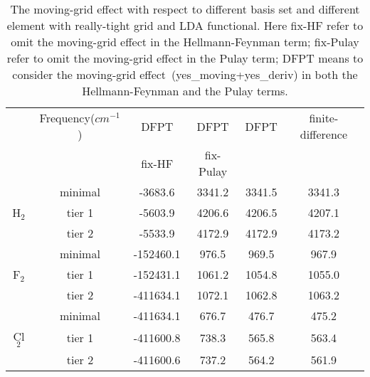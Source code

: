 \documentclass[journal=jpca,manuscript=article]{achemso}
\begin{document}
\begin{table}
\scalebox{0.8}
{
\begin{tabular}{ c c | c    c    c c    }
\hline \hline  
   &   Frequency($cm^{-1}$)    &  DFPT  &  DFPT & DFPT   & finite-difference    \\ 
   &                              &  fix-HF  &  fix-Pulay &  &    \\ 
\hline \hline  
   &    minimal       & -3683.6 &  3341.2  &   3341.5       &  3341.3 \\ 
H$_2$ & tier 1         & -5603.9 &  4206.6    &   4206.5      &  4207.1  \\    
   & tier 2         & -5533.9 & 4172.9    & 4172.9      &  4173.2 \\ 
\hline
   &  minimal         & -152460.1   &  976.5    &   969.5       & 967.9    \\ 
F$_2$ & tier 1         & -152431.1    & 1061.2     &  1054.8      & 1055.0    \\    
   & tier 2         & -411634.1   & 1072.1    &    1062.8      &  1063.2    \\ 
\hline
   &  minimal        & -411634.1   &  676.7   &  476.7      &   475.2    \\ 
Cl$_2$ & tier 1       & -411600.8    & 738.3   &    565.8     &   563.4   \\    
   & tier 2        & -411600.6   &  737.2   &    564.2    &     561.9  \\ 
\hline \hline 
\end{tabular}
}
\caption{The moving-grid effect with respect to different basis set and different element with really-tight grid and LDA functional. Here fix-HF refer to omit the moving-grid effect in the Hellmann-Feynman term;  fix-Pulay refer to omit the moving-grid effect in the Pulay term; DFPT means to consider the moving-grid effect~(yes\_moving+yes\_deriv) in both the Hellmann-Feynman and the Pulay terms. }
\label{tab:H2-F2-Cl2}
\end{table}
\end{document}
